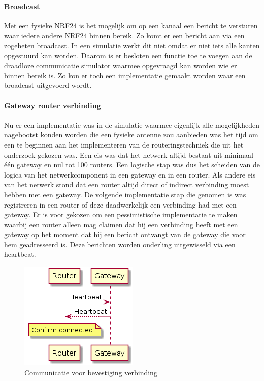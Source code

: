 \documentclass[a4paper, 11pt, oneside]{report}
\begin{document}
\paragraph{Broadcast}
Met een fysieke NRF24 is het mogelijk om op een kanaal een bericht te versturen waar iedere andere NRF24 binnen bereik.
Zo komt er een bericht aan via een zogeheten broadcast. 
In een simulatie werkt dit niet omdat er niet iets alle kanten opgestuurd kan worden.
Daarom is er besloten een functie toe te voegen aan de draadloze communicatie simulator waarmee opgevraagd kan worden wie er binnen bereik is. Zo kon er toch een implementatie gemaakt worden waar een broadcast uitgevoerd wordt.  
\paragraph{Gateway router verbinding}
Nu er een implementatie was in de simulatie waarmee eigenlijk alle mogelijkheden nagebootst konden worden die een fysieke antenne zou aanbieden was het tijd om een te beginnen aan het implementeren van de routeringstechniek die uit het onderzoek gekozen was.
Een eis was dat het netwerk altijd bestaat uit minimaal één gateway en nul tot 100 routers.
Een logische stap was dus het scheiden van de logica van het netwerkcomponent in een gateway en in een router.
Als andere eis van het netwerk stond dat een router altijd direct of indirect verbinding moest hebben met een gateway.
De volgende implementatie stap die genomen is was registreren in een router of deze daadwerkelijk een verbinding had met een gateway.
Er is voor gekozen om een pessimistische implementatie te maken waarbij een router alleen mag claimen dat hij een verbinding heeft met een gateway op het moment dat hij een bericht ontvangt van de gateway die voor hem geadresseerd is.
Deze berichten worden onderling uitgewisseld via een heartbeat. 

\begin{figure}[H]
	\begin{center}\includegraphics[width=0.2\linewidth]{Afbeeldingen/heartbeat.png}\end{center}
	\caption{Communicatie voor bevestiging verbinding}
	\label{fig:bevestigingverbinding}
\end{figure}
\end{document}
